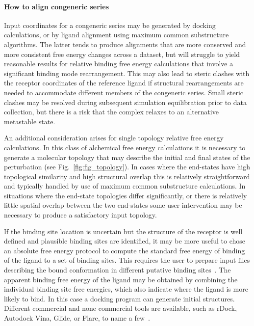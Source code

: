 \documentclass[9pt,bestpractices]{livecoms}
\begin{document}
\paragraph{How to align congeneric series}
Input coordinates for a congeneric series may be generated by docking calculations, or by ligand alignment using maximum common substructure algorithms. The latter tends to produce alignments that are more conserved and more consistent free energy changes across a dataset, but will struggle to yield reasonable results for relative binding free energy calculations that involve a significant binding mode rearrangement. This may also lead to steric clashes with the receptor coordinates of the reference ligand if structural rearrangements are needed to accommodate different members of the congeneric series. Small steric clashes may be resolved during subsequent simulation equilibration prior to data collection, but there is a risk that the complex relaxes to an alternative metastable state. 

An additional consideration arises for single topology relative free energy calculations. In this class of alchemical free energy calculations it is necessary to generate a molecular topology that may describe the initial and final states of the perturbation (see Fig.~\ref{fig:fig_topology}). In cases where the end-states have high topological similarity and high structural overlap this is relatively straightforward and typically handled by use of maximum common substructure calculations. In situations where the end-state topologies differ significantly, or there is relatively little spatial overlap between the two end-states some user intervention may be necessary to produce a satisfactory input topology.

If the binding site location is uncertain but the structure of the receptor is well defined and plausible binding sites are identified, it may be more useful to chose an absolute free energy protocol to compute the standard free energy of binding of the ligand to a set of binding sites. This requires the user to prepare input files describing the bound conformation in different putative binding sites~\cite{evoli2016multiple}. The apparent binding free energy of the ligand may be obtained by combining the individual binding site free energies, which also indicate where the ligand is more likely to bind. In this case a docking program can generate initial structures. Different commercial and none commercial tools are available, such as rDock, Autodock Vina, Glide, or Flare, to name a few~\cite{ruiz-carmona2014rdock, trott2010autodock, friesner2004glide, kuhn2020automated}. 
\end{document}
